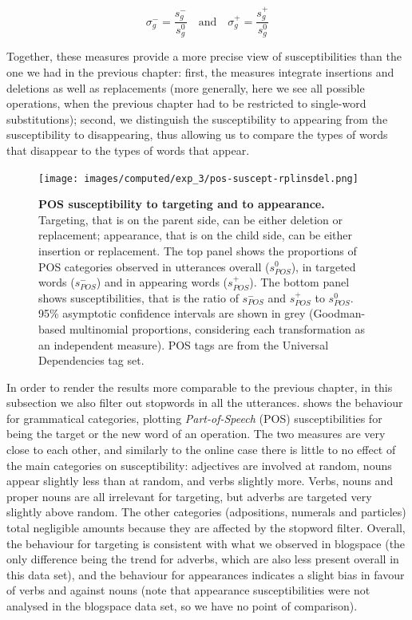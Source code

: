 \[\sigma_g^- = \frac{s_g^-}{s_g^0} \quad \text{and} \quad \sigma_g^+ = \frac{s_g^+}{s_g^0}\]

Together, these measures provide a more precise view of susceptibilities
than the one we had in the previous chapter: first, the measures
integrate insertions and deletions as well as replacements (more
generally, here we see all possible operations, when the previous
chapter had to be restricted to single-word substitutions); second, we
distinguish the susceptibility to appearing from the susceptibility to
disappearing, thus allowing us to compare the types of words that
disappear to the types of words that appear.

\begin{figure}[!ht]
  \centering
  \texttt{[image: images/computed/exp\_3/pos-suscept-rplinsdel.png]}
  \caption[POS susceptibility to targeting and to appearance]{
  \textbf{POS susceptibility to targeting and to appearance.}
  Targeting, that is on the parent side, can be either deletion or replacement;
  appearance, that is on the child side, can be either insertion or replacement.
  The top panel shows the proportions of POS categories observed in utterances overall ($s_{POS}^0$), in targeted words ($s_{POS}^-$) and in appearing words ($s_{POS}^+$).
  The bottom panel shows susceptibilities, that is the ratio of $s_{POS}^-$ and $s_{POS}^+$ to $s_{POS}^0$.
  95\% asymptotic confidence intervals are shown in grey (Goodman-based multinomial proportions, considering each transformation as an independent measure).
  POS tags are from the Universal Dependencies tag set.
  }
  \label{fig:gistr-suscept-pos}
\end{figure}

In order to render the results more comparable to the previous chapter,
in this subsection we also filter out stopwords in all the utterances.
 shows the behaviour for grammatical
categories, plotting \emph{Part-of-Speech} (POS) susceptibilities for
being the target or the new word of an operation. The two measures are
very close to each other, and similarly to the online case there is
little to no effect of the main categories on susceptibility: adjectives
are involved at random, nouns appear slightly less than at random, and
verbs slightly more. Verbs, nouns and proper nouns are all irrelevant
for targeting, but adverbs are targeted very slightly above random. The
other categories (adpositions, numerals and particles) total negligible
amounts because they are affected by the stopword filter. Overall, the
behaviour for targeting is consistent with what we observed in blogspace
(the only difference being the trend for adverbs, which are also less
present overall in this data set), and the behaviour for appearances
indicates a slight bias in favour of verbs and against nouns (note that
appearance susceptibilities were not analysed in the blogspace data set,
so we have no point of comparison).

